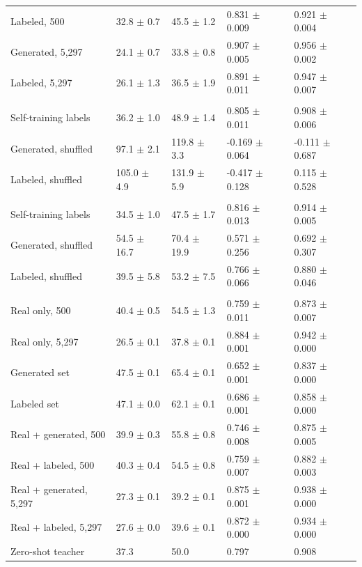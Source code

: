 \begin{tabular}{@{}lllll@{}}
\quad Labeled, 500 & 32.8 $\pm$ 0.7 & 45.5 $\pm$ 1.2 & 0.831 $\pm$ 0.009 & 0.921 $\pm$ 0.004 \\
\quad Generated, 5,297 & 24.1 $\pm$ 0.7 & 33.8 $\pm$ 0.8 & 0.907 $\pm$ 0.005 & 0.956 $\pm$ 0.002 \\
\quad Labeled, 5,297 & 26.1 $\pm$ 1.3 & 36.5 $\pm$ 1.9 & 0.891 $\pm$ 0.011 & 0.947 $\pm$ 0.007 \\
\addlinespace
\multicolumn{5}{@{}l}{\emph{Controls, stage 1 alone}} \\
\quad Self-training labels & 36.2 $\pm$ 1.0 & 48.9 $\pm$ 1.4 & 0.805 $\pm$ 0.011 & 0.908 $\pm$ 0.006 \\
\quad Generated, shuffled & 97.1 $\pm$ 2.1 & 119.8 $\pm$ 3.3 & -0.169 $\pm$ 0.064 & -0.111 $\pm$ 0.687 \\
\quad Labeled, shuffled & 105.0 $\pm$ 4.9 & 131.9 $\pm$ 5.9 & -0.417 $\pm$ 0.128 & 0.115 $\pm$ 0.528 \\
\addlinespace
\multicolumn{5}{@{}l}{\emph{Controls, after 500 real polymers}} \\
\quad Self-training labels & 34.5 $\pm$ 1.0 & 47.5 $\pm$ 1.7 & 0.816 $\pm$ 0.013 & 0.914 $\pm$ 0.005 \\
\quad Generated, shuffled & 54.5 $\pm$ 16.7 & 70.4 $\pm$ 19.9 & 0.571 $\pm$ 0.256 & 0.692 $\pm$ 0.307 \\
\quad Labeled, shuffled & 39.5 $\pm$ 5.8 & 53.2 $\pm$ 7.5 & 0.766 $\pm$ 0.066 & 0.880 $\pm$ 0.046 \\
\addlinespace
\multicolumn{5}{@{}l}{\emph{Random forest}} \\
\quad Real only, 500 & 40.4 $\pm$ 0.5 & 54.5 $\pm$ 1.3 & 0.759 $\pm$ 0.011 & 0.873 $\pm$ 0.007 \\
\quad Real only, 5,297 & 26.5 $\pm$ 0.1 & 37.8 $\pm$ 0.1 & 0.884 $\pm$ 0.001 & 0.942 $\pm$ 0.000 \\
\quad Generated set & 47.5 $\pm$ 0.1 & 65.4 $\pm$ 0.1 & 0.652 $\pm$ 0.001 & 0.837 $\pm$ 0.000 \\
\quad Labeled set & 47.1 $\pm$ 0.0 & 62.1 $\pm$ 0.1 & 0.686 $\pm$ 0.001 & 0.858 $\pm$ 0.000 \\
\quad Real + generated, 500 & 39.9 $\pm$ 0.3 & 55.8 $\pm$ 0.8 & 0.746 $\pm$ 0.008 & 0.875 $\pm$ 0.005 \\
\quad Real + labeled, 500 & 40.3 $\pm$ 0.4 & 54.5 $\pm$ 0.8 & 0.759 $\pm$ 0.007 & 0.882 $\pm$ 0.003 \\
\quad Real + generated, 5,297 & 27.3 $\pm$ 0.1 & 39.2 $\pm$ 0.1 & 0.875 $\pm$ 0.001 & 0.938 $\pm$ 0.000 \\
\quad Real + labeled, 5,297 & 27.6 $\pm$ 0.0 & 39.6 $\pm$ 0.1 & 0.872 $\pm$ 0.000 & 0.934 $\pm$ 0.000 \\
\midrule
Zero-shot teacher & 37.3 & 50.0 & 0.797 & 0.908 \\
\bottomrule
\end{tabular}
